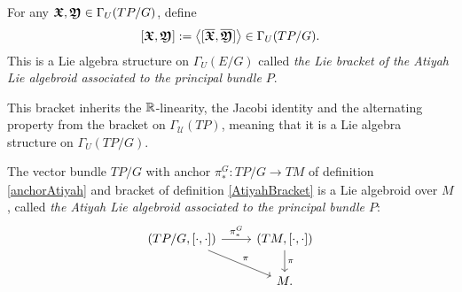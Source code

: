 \begin{definition}\label{AtiyahBracket}
For any $\bm{\mathfrak{X}}, \bm{\mathfrak{Y}} \in \Gamma_U(TP/G)$, define 
\begin{align} \label{bracketDefn}
    [\bm{\mathfrak{X}}, \bm{\mathfrak{Y}}] := \left\langle [\overline{\bm{\bm{\mathfrak{X}}}}, \overline{\bm{\bm{\mathfrak{Y}}}}] \right\rangle \in \Gamma_U(TP/G).
\end{align}
This is a Lie algebra structure on $\Gamma_U(E/G)$ called \emph{the Lie bracket of the Atiyah Lie algebroid associated to the principal bundle $P$}.
\end{definition}

This bracket inherits the $\mathbb{R}$-linearity, the Jacobi identity and the alternating property from the bracket on $\Gamma_{\mathcal U}(TP)$, meaning that it is a Lie algebra structure on $\Gamma_U(TP/G)$.

\begin{theorem}
The vector bundle $TP/G$ with anchor $\pi_*^G:TP/G \to TM$ of definition \ref{anchorAtiyah} and bracket of definition \ref{AtiyahBracket} is a Lie algebroid over $M$, called \emph{the Atiyah Lie algebroid associated to the principal bundle $P$}:
\begin{equation}
    \begin{tikzcd}
    (TP/G, [\cdot, \cdot]) \arrow{r}{\pi^G_*} \arrow{dr}{\pi} & (TM, [\cdot, \cdot]) \arrow{d}{\pi}\\
    & M.
    \end{tikzcd}
\end{equation}
\end{theorem}

